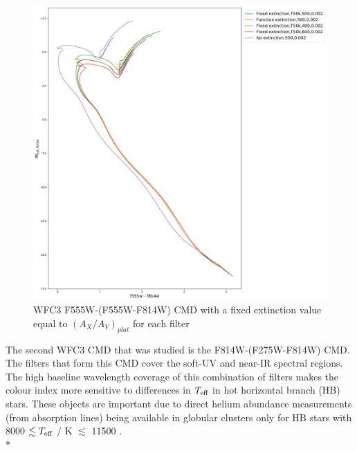 \documentclass[12pt, a4paper]{report}
\begin{document}
\begin{figure}[h!]
\begin{center}
\includegraphics[width=1.0\textwidth]{../basti_isochrones_10_13Gyr/Extinction_T50k_FeH0fix_func_f555w_f555wmf814w_500_400_600_Myr_FeH_0p002_ref_noext_Av_1p0.pdf}
\caption{WFC3 F555W-(F555W-F814W) CMD with a fixed extinction value equal to $(A_{X}/A_{V})_{plat}$ for each filter}
\label{wfc3_isoc1_T50k}
\end{center}
\end{figure}

The second WFC3 CMD that was studied is the F814W-(F275W-F814W) CMD. The filters that form this CMD cover the soft-UV and near-IR spectral regions. The high baseline wavelength coverage of this combination of filters makes the colour index more sensitive to differences in $T_{\textnormal{eff}}$ in hot horizontal branch (HB) stars. These objects are important due to direct helium abundance measurements (from absorption lines) being available in globular clusters only for HB stars with 8000 $\lesssim T_{\textnormal{eff}}$ / K $\lesssim$ 11500 \citep{2018MNRAS.475.4088L}. \\*
\end{document}
